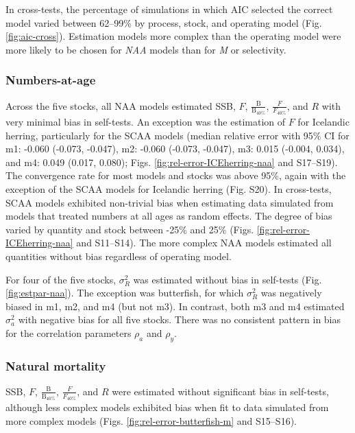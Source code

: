 \documentclass[]{article}
\begin{document}
In cross-tests, the percentage of simulations in which AIC selected the
correct model varied between 62--99\% by process, stock, and operating
model (Fig. \ref{fig:aic-cross}). Estimation models more complex than
the operating model were more likely to be chosen for \emph{NAA} models
than for \emph{M} or selectivity.

\hypertarget{numbers-at-age}{%
\subsubsection{Numbers-at-age}\label{numbers-at-age}}

Across the five stocks, all NAA models estimated SSB, \(F\),
\(\frac{\text{B}}{\text{B}_{40\%}}\), \(\frac{F}{F_{40\%}}\), and \(R\)
with very minimal bias in self-tests. An exception was the estimation of
\(F\) for Icelandic herring, particularly for the SCAA models (median
relative error with 95\% CI for m1: -0.060 (-0.073, -0.047), m2: -0.060
(-0.073, -0.047), m3: 0.015 (-0.004, 0.034), and m4: 0.049 (0.017,
0.080); Figs. \ref{fig:rel-error-ICEherring-naa} and S17--S19). The
convergence rate for most models and stocks was above 95\%, again with
the exception of the SCAA models for Icelandic herring (Fig. S20). In
cross-tests, SCAA models exhibited non-trivial bias when estimating data
simulated from models that treated numbers at all ages as random
effects. The degree of bias varied by quantity and stock between -25\%
and 25\% (Figs. \ref{fig:rel-error-ICEherring-naa} and S11--S14). The
more complex NAA models estimated all quantities without bias regardless
of operating model.

For four of the five stocks, \(\sigma^2_R\) was estimated without bias
in self-tests (Fig. \ref{fig:estpar-naa}). The exception was butterfish,
for which \(\sigma^2_R\) was negatively biased in m1, m2, and m4 (but
not m3). In contrast, both m3 and m4 estimated \(\sigma^2_a\) with
negative bias for all five stocks. There was no consistent pattern in
bias for the correlation parameters \(\rho_a\) and \(\rho_y\).

\hypertarget{natural-mortality}{%
\subsubsection{Natural mortality}\label{natural-mortality}}

SSB, \(F\), \(\frac{\text{B}}{\text{B}_{40\%}}\),
\(\frac{F}{F_{40\%}}\), and \(R\) were estimated without significant
bias in self-tests, although less complex models exhibited bias when fit
to data simulated from more complex models (Figs.
\ref{fig:rel-error-butterfish-m} and S15--S16).
\end{document}

